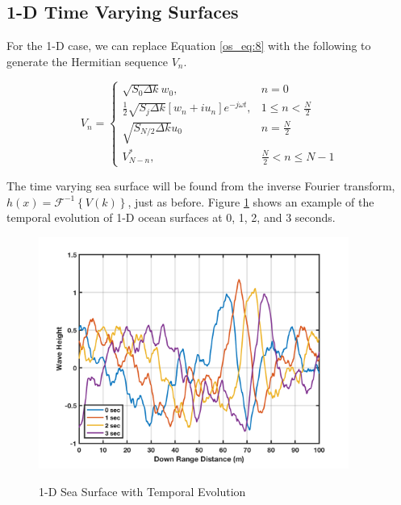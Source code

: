 \subsection {1-D Time Varying Surfaces}
For the 1-D case, we can replace Equation \ref{os_eq:8} with the following to generate the Hermitian sequence $V_n$.

\begin{equation}
  \label{os_eq:888}   
  V_n = \begin{cases}
    \sqrt{S_0\Delta k}w_0, & n = 0 \\
    \frac{1}{2}\sqrt{S_j\Delta k}\left[w_n + iu_n \right]e^{-j\omega t}, & 1 \leq n < \frac{N}{2} \\
   \sqrt{S_{N/2}\Delta k}u_0 & n = \frac{N}{2} \\
    V_{N-n}^*, &  \frac{N}{2} < n \leq N-1 
  \end{cases} 
\end{equation}
\renewcommand{\baselinestretch}{2} \small\normalsize

The time varying sea surface will be found from the inverse Fourier transform, $h(x) = \mathcal{F}^{-1}\left\{V(k) \right\}$, just as before. Figure \ref{os_fig:15} shows an example of the temporal evolution of 1-D ocean surfaces at 0, 1, 2, and 3 seconds.

\begin{figure}[ht]
  \begin{center}
\includegraphics[width=4in]{../media/Ocean_Surface/temporal_sea_surfaces.png}
  \end{center}
  \renewcommand{\baselinestretch}{1} \small\normalsize
  \begin{quote}
    \caption[1-D Sea Surface with Temporal Evolution]{1-D Sea Surface with Temporal Evolution\label{os_fig:15}}
  \end{quote}
\end{figure}
\renewcommand{\baselinestretch}{2} \small\normalsize

